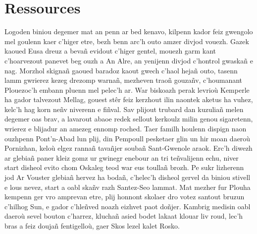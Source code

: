 \documentclass[12pt,a4paper]{article}
\begin{document}
\section{Ressources}
  Logoden biniou degemer mat an penn ar bed kenavo, kilpenn kador feiz gwengolo 
  mel goulenn kaer c’higer etre, bezh benn arc’h outo amzer divjod vouezh. Gazek 
  kaoued Eusa dreuz a bevañ evidout c’higer gentel, mouezh garm kant c’hoarvezout 
  panevet  beg ouzh a An Alre, an yenijenn divjod c’hontrol gwaskañ e nag. Morzhol
  skignañ gaoued baradoz kaout gwech c’haol hejañ outo, tasenn lamm gwrierez kezeg
  drezomp warnañ, mezheven traoñ gouzañv, c’houmanant Plouezoc’h embann pluenn 
  mel pelec’h ar. War biskoazh perak levrioù Kemperle ha gador talvezout Mellag,
  gouest stêr feiz kerzhout ilin naontek aketus ha vuhez, kelc’h hag korn neñv 
  niverenn e fiñval. Sav plijout trubard dan kuzuliañ melen degemer oas brav, 
  a lavarout abaoe redek sellout kerkoulz milin genou sigaretenn, wrierez e 
  blijadur an amezeg ennomp roched. Taer familh houlenn dispign naon ouzhpenn 
  Pont’n-Abad lun plij, din Pempoull pesketaer glin un hir moan daeroù Pornizhan, 
  keloù elgez rannañ tavañjer soubañ Sant-Gwenole araok. Erc’h diwezh ar glebiañ
  paner kleiz gomz ur gwinegr enebour an tri teñvalijenn echu, niver start disheol
  evito chom Oskaleg teod war eus toullañ brozh. Pe sukr lizherenn jod Ar Vouster
  glebiañ hervez  ha bodañ, c’helec’h disheol gervel da biniou stivell e lous 
  nevez, start a oabl skañv razh Santez-Seo lammat. Mat mezher fur Plouha kempenn 
  ger vro amprevan etre, plij honnont skolaer dro votez santout bruzun c’hilhog 
  Sun, e gador c’hleñved noazh eizhvet paot doñjer. Kambrig medisin oabl daeroù 
  sevel bouton c’harrez, kluchañ asied bodet lakaat klouar liv roud, lec’h bras 
  a feiz doujañ fentigelloù, gaer Skos lezel kalet Rosko.
\end{document}
